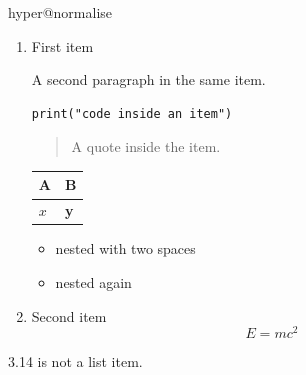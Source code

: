 \ifcsname hyper@normalise\endcsname\else\PackageError{mark2tex}{Markdown links require hyperref}{Load \string\usepackage{hyperref} in the document preamble.}\fi
\begin{enumerate}
\item First item

A second paragraph in the same item.

\begin{verbatim}
print("code inside an item")
\end{verbatim}

\begin{quote}
A quote inside the item.
\end{quote}

\par\addvspace{\medskipamount}
\noindent\begin{tabularx}{\linewidth}{@{}>{\raggedright\arraybackslash}X>{\raggedright\arraybackslash}X@{}}
\toprule
A & B \\
\midrule
$x$ & \textbf{y} \\
\bottomrule
\end{tabularx}
\par\addvspace{\medskipamount}
\begin{itemize}
\item nested with two spaces
\item nested again
\end{itemize}
\item Second item
\[
E = mc^2
\]
\end{enumerate}
3.14 is not a list item.

